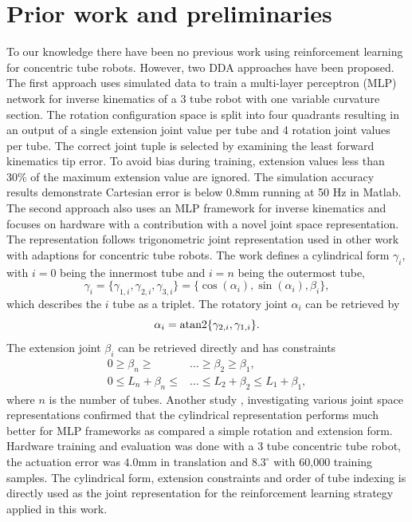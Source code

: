 \section{Prior work and preliminaries}
\label{prelims}
To our knowledge there have been no previous work using reinforcement learning for concentric tube robots. However, two DDA approaches have been proposed. The first approach \cite{Bergeles2015} uses simulated data to train a multi-layer perceptron (MLP) network for inverse kinematics of a 3 tube robot with one variable curvature section. The rotation configuration space is split into four quadrants resulting in an output of a single extension joint value per tube and 4 rotation joint values per tube. The correct joint tuple is selected by examining the least forward kinematics tip error. To avoid bias during training, extension values less than 30\% of the maximum extension value are ignored. The simulation accuracy results demonstrate Cartesian error is below 0.8mm running at 50 Hz in Matlab. The second approach \cite{Grassmann2018} also uses an MLP framework for inverse kinematics and focuses on hardware with a contribution with a novel joint space representation. The representation follows trigonometric joint representation used in other work with adaptions for concentric tube robots. The work defines a cylindrical form $\gamma_i$, with $i=0$ being the innermost tube and $i=n$ being the outermost tube,
\begin{equation}
\gamma_i = \{ \gamma_{1,i}, \gamma_{2,i}, \gamma_{3,i} \} = \{ \cos(\alpha_i), \sin(\alpha_i), \beta_i \},\label{eqn:1}
\end{equation}
which describes the $i$ tube as a triplet. The rotatory joint $\alpha_i$ can be retrieved by
\begin{equation}
\alpha_i = \textnormal{atan2} \{ \gamma_{2,i}, \gamma_{1,i} \}. \label{eqn:2}
\end{equation}
The extension joint $\beta_i$ can be retrieved directly and has constraints
\begin{align}
0 \geq \beta_n \geq & \dots \geq \beta_2 \geq \beta_1, \label{eqn:3} \\
0 \leq L_n + \beta_n \leq & \dots \leq L_2 + \beta_2 \leq L_1 + \beta_1, \label{eqn:4}
\end{align}
where $n$ is the number of tubes. Another study \cite{Grassmann2019}, investigating various joint space representations confirmed that the cylindrical representation performs much better for MLP frameworks as compared a simple rotation and extension form. Hardware training and evaluation was done with a 3 tube concentric tube robot, the actuation error was $4.0$mm in translation and $8.3 ^{\circ}$ with 60,000 training samples. The cylindrical form, extension constraints and order of tube indexing is directly used as the joint representation for the reinforcement learning strategy applied in this work.

